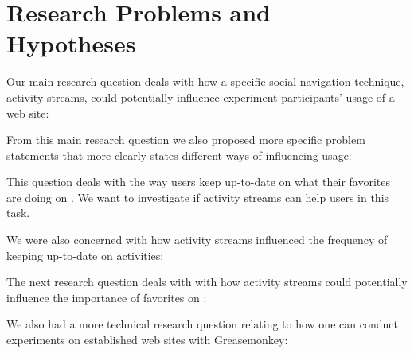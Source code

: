\section{Research Problems and Hypotheses}

Our main research question deals with how a specific social navigation
technique, activity streams, could potentially influence experiment
participants' usage of a web site:

\begin{quote}
\end{quote}

From this main research question we also proposed more specific problem
statements that more clearly states different ways of influencing usage:

\begin{quote}
\end{quote}

This question deals with the way users keep up-to-date on what their favorites
are doing on \urort{}. We want to investigate if activity streams can help
users in this task.

We were also concerned with how activity streams influenced the
frequency of keeping up-to-date on activities:

\begin{quote}
\end{quote}

The next research question deals with with how activity streams could
potentially influence the importance of favorites on \urort{}:

\begin{quote}
\end{quote}

We also had a more technical research question relating to how one can
conduct experiments on established web sites with Greasemonkey:

\begin{quote}
\end{quote}

